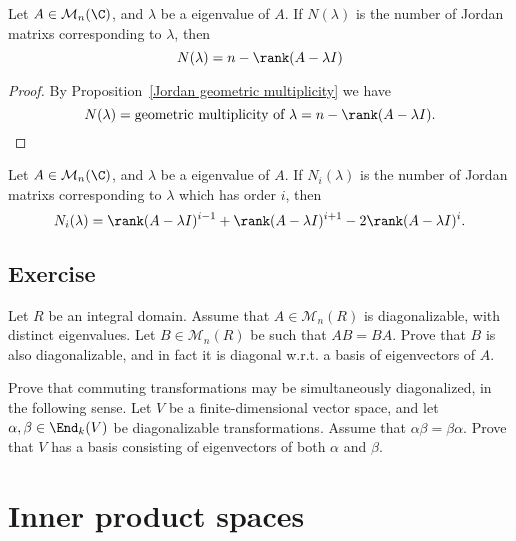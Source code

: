 \begin{corollary}
Let $A\in\mathcal{M}_{n}(\C)$, and $\lambda$ be a eigenvalue of $A$. If $N(\lambda)$ is the number of Jordan matrixs corresponding to $\lambda$, then
\[N(\lambda)=n-\rank(A-\lambda I)\]
\end{corollary}
\begin{proof}
By Proposition~\ref{Jordan geometric multiplicity} we have
\[N(\lambda)=\text{geometric multiplicity of $\lambda$}=n-\rank(A-\lambda I).\]
\end{proof}
\begin{proposition}
Let $A\in\mathcal{M}_{n}(\C)$, and $\lambda$ be a eigenvalue of $A$. If $N_i(\lambda)$ is the number of Jordan matrixs corresponding to $\lambda$ which has order $i$, then
\[N_i(\lambda)=\rank(A-\lambda I)^{i-1}+\rank(A-\lambda I)^{i+1}-2\rank(A-\lambda I)^{i}.\]
\end{proposition}
\subsection{Exercise}
\begin{exercise}
Let $R$ be an integral domain. Assume that $A\in\mathcal{M}_n(R)$ is diagonalizable, with distinct eigenvalues. Let $B\in\mathcal{M}_n(R)$ be such that $AB=BA$. Prove that $B$ is also diagonalizable, and in fact it is diagonal w.r.t. a basis of eigenvectors of $A$.
\end{exercise}
\begin{exercise}
Prove that commuting transformations may be simultaneously diagonalized, in the following sense. Let $V$ be a finite-dimensional vector space, and let $\alpha,\beta\in\End_k(V)$ be diagonalizable transformations. Assume that $\alpha\beta=\beta\alpha$. Prove that $V$ has a basis consisting of eigenvectors of both $\alpha$ and $\beta$.
\end{exercise}
\section{Inner product spaces}
